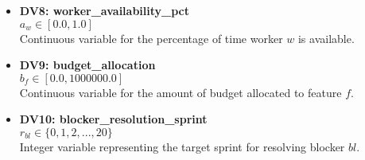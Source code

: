 \documentclass[11pt]{article}
\begin{document}
\begin{itemize}
    \item \textbf{DV8: worker\_availability\_pct} \\
    $a_w \in [0.0, 1.0]$ \\
    Continuous variable for the percentage of time worker $w$ is available.

    \item \textbf{DV9: budget\_allocation} \\
    $b_{f} \in [0.0, 1000000.0]$ \\
    Continuous variable for the amount of budget allocated to feature $f$.

    \item \textbf{DV10: blocker\_resolution\_sprint} \\
    $r_{bl} \in \{0, 1, 2, ..., 20\}$ \\
    Integer variable representing the target sprint for resolving blocker $bl$.
\end{itemize}
\end{document}
